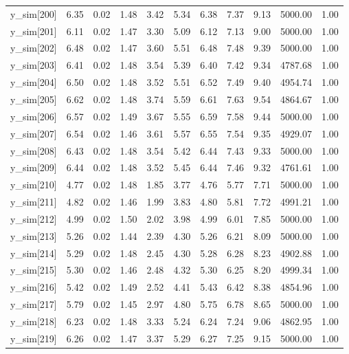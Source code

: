 \begin{table}[ht]
\begin{tabular}{rrrrrrrrrrr}
  y\_sim[200] & 6.35 & 0.02 & 1.48 & 3.42 & 5.34 & 6.38 & 7.37 & 9.13 & 5000.00 & 1.00 \\ 
  y\_sim[201] & 6.11 & 0.02 & 1.47 & 3.30 & 5.09 & 6.12 & 7.13 & 9.00 & 5000.00 & 1.00 \\ 
  y\_sim[202] & 6.48 & 0.02 & 1.47 & 3.60 & 5.51 & 6.48 & 7.48 & 9.39 & 5000.00 & 1.00 \\ 
  y\_sim[203] & 6.41 & 0.02 & 1.48 & 3.54 & 5.39 & 6.40 & 7.42 & 9.34 & 4787.68 & 1.00 \\ 
  y\_sim[204] & 6.50 & 0.02 & 1.48 & 3.52 & 5.51 & 6.52 & 7.49 & 9.40 & 4954.74 & 1.00 \\ 
  y\_sim[205] & 6.62 & 0.02 & 1.48 & 3.74 & 5.59 & 6.61 & 7.63 & 9.54 & 4864.67 & 1.00 \\ 
  y\_sim[206] & 6.57 & 0.02 & 1.49 & 3.67 & 5.55 & 6.59 & 7.58 & 9.44 & 5000.00 & 1.00 \\ 
  y\_sim[207] & 6.54 & 0.02 & 1.46 & 3.61 & 5.57 & 6.55 & 7.54 & 9.35 & 4929.07 & 1.00 \\ 
  y\_sim[208] & 6.43 & 0.02 & 1.48 & 3.54 & 5.42 & 6.44 & 7.43 & 9.33 & 5000.00 & 1.00 \\ 
  y\_sim[209] & 6.44 & 0.02 & 1.48 & 3.52 & 5.45 & 6.44 & 7.46 & 9.32 & 4761.61 & 1.00 \\ 
  y\_sim[210] & 4.77 & 0.02 & 1.48 & 1.85 & 3.77 & 4.76 & 5.77 & 7.71 & 5000.00 & 1.00 \\ 
  y\_sim[211] & 4.82 & 0.02 & 1.46 & 1.99 & 3.83 & 4.80 & 5.81 & 7.72 & 4991.21 & 1.00 \\ 
  y\_sim[212] & 4.99 & 0.02 & 1.50 & 2.02 & 3.98 & 4.99 & 6.01 & 7.85 & 5000.00 & 1.00 \\ 
  y\_sim[213] & 5.26 & 0.02 & 1.44 & 2.39 & 4.30 & 5.26 & 6.21 & 8.09 & 5000.00 & 1.00 \\ 
  y\_sim[214] & 5.29 & 0.02 & 1.48 & 2.45 & 4.30 & 5.28 & 6.28 & 8.23 & 4902.88 & 1.00 \\ 
  y\_sim[215] & 5.30 & 0.02 & 1.46 & 2.48 & 4.32 & 5.30 & 6.25 & 8.20 & 4999.34 & 1.00 \\ 
  y\_sim[216] & 5.42 & 0.02 & 1.49 & 2.52 & 4.41 & 5.43 & 6.42 & 8.38 & 4854.96 & 1.00 \\ 
  y\_sim[217] & 5.79 & 0.02 & 1.45 & 2.97 & 4.80 & 5.75 & 6.78 & 8.65 & 5000.00 & 1.00 \\ 
  y\_sim[218] & 6.23 & 0.02 & 1.48 & 3.33 & 5.24 & 6.24 & 7.24 & 9.06 & 4862.95 & 1.00 \\ 
  y\_sim[219] & 6.26 & 0.02 & 1.47 & 3.37 & 5.29 & 6.27 & 7.25 & 9.15 & 5000.00 & 1.00 \\ 

\end{tabular}
\end{table}
